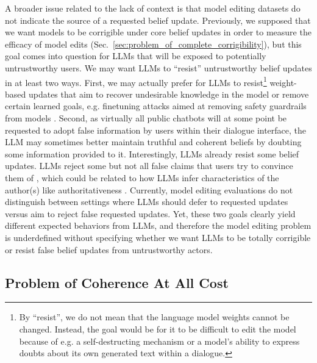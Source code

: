 \documentclass[11pt,a4paper]{article}
\begin{document}
A broader issue related to the lack of context is that model editing datasets do not indicate the source of a requested belief update. 
Previously, we supposed that we want models to be corrigible under core belief updates in order to measure the efficacy of model edits (Sec.~\ref{sec:problem_of_complete_corrigibility}), but this goal comes into question for LLMs that will be exposed to potentially untrustworthy users. We may want LLMs to ``resist'' untrustworthy belief updates in at least two ways. 
First, we may actually prefer for LLMs to resist\footnote{By ``resist'', we do not mean that the language model weights cannot be changed. Instead, the goal would be for it to be difficult to edit the model because of e.g. a self-destructing mechanism \citep{henderson2023self} or a model's ability to express doubts about its own generated text within a dialogue.} weight-based updates that aim to recover undesirable knowledge in the model or remove certain learned goals, e.g. finetuning attacks aimed at removing safety guardrails from models \citep{qi2023fine}. 
Second, as virtually all public chatbots will at some point be requested to adopt false information by users within their dialogue interface, the LLM may sometimes better maintain truthful and coherent beliefs by doubting some information provided to it. 
Interestingly, LLMs already resist some belief updates. LLMs reject some but not all false claims that users try to convince them of \citep{xu2023earth}, which could be related to how LLMs infer characteristics of the author(s) like authoritativeness \citep{sharma2023towards}. 
Currently, model editing evaluations do not distinguish between settings where LLMs should defer to requested updates versus aim to reject false requested updates. Yet, these two goals clearly yield different expected behaviors from LLMs, and therefore the model editing problem is underdefined without specifying whether we want LLMs to be totally corrigible or resist false belief updates from untrustworthy actors.

\subsection{Problem of Coherence At All Cost}
\label{sec:problem_of_coherence_at_all_cost}
\end{document}
